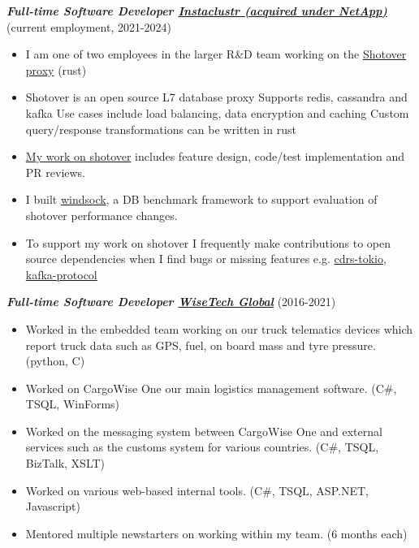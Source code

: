 \documentclass[line, resMargin, a4paper]{res}
\begin{document}
\begin{resume}
    \textbf{\emph {Full-time Software Developer \href{https://www.instaclustr.com}{Instaclustr (acquired under NetApp) }}} (current employment, 2021-2024)
    \begin{itemize}
        \item I am one of two employees in the larger R\&D team working on the \href{https://github.com/shotover/shotover-proxy}{Shotover proxy} (rust)
        \item Shotover is an open source L7 database proxy
            \subitem Supports redis, cassandra and kafka
            \subitem Use cases include load balancing, data encryption and caching
            \subitem Custom query/response transformations can be written in rust
        \item \href{https://github.com/shotover/shotover-proxy/pulls?q=author%3Arukai}{My work on shotover} includes feature design, code/test implementation and PR reviews.
        \item I built \href{https://github.com/shotover/windsock}{windsock}, a DB benchmark framework to support evaluation of shotover performance changes.
        \item To support my work on shotover I frequently make contributions to open source dependencies when I find bugs or missing features e.g. \href{https://github.com/krojew/cdrs-tokio/pulls?q=author%3Arukai}{cdrs-tokio}, \href{https://github.com/tychedelia/kafka-protocol-rs/pulls?q=is%3Apr+is%3Aclosed+author%3Arukai}{kafka-protocol}
    \end{itemize}

    \textbf{\emph {Full-time Software Developer \href{http://www.wisetechglobal.com}{WiseTech Global}}} (2016-2021)
    \begin{itemize}
        \item Worked in the embedded team working on our truck telematics devices which report truck data such as GPS, fuel, on board mass and tyre pressure. (python, C)
        \item Worked on CargoWise One our main logistics management software. (C\#, TSQL, WinForms)
        \item Worked on the messaging system between CargoWise One and external services such as the customs system for various countries. (C\#, TSQL, BizTalk, XSLT)
        \item Worked on various web-based internal tools. (C\#, TSQL, ASP.NET, Javascript)
        \item Mentored multiple newstarters on working within my team. (6 months each)
    \end{itemize}


\end{resume}
\end{document}
